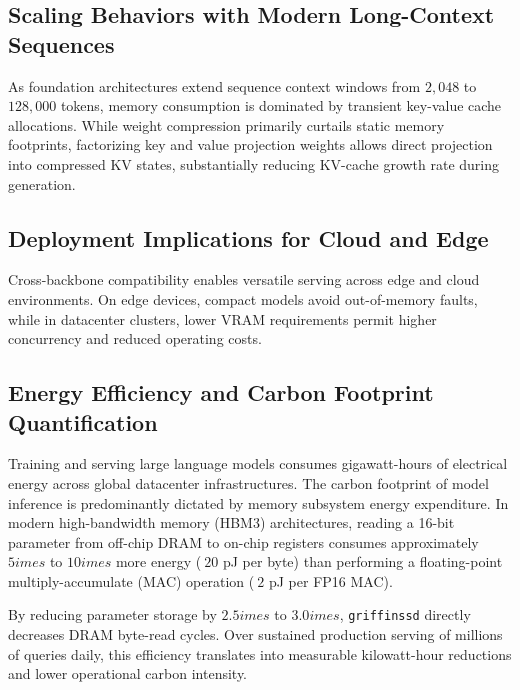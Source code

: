 \subsection{Scaling Behaviors with Modern Long-Context Sequences}
As foundation architectures extend sequence context windows from $2{,}048$ to $128{,}000$ tokens, memory consumption is dominated by transient key-value cache allocations. While weight compression primarily curtails static memory footprints, factorizing key and value projection weights allows direct projection into compressed KV states, substantially reducing KV-cache growth rate during generation.

\subsection{Deployment Implications for Cloud and Edge}
Cross-backbone compatibility enables versatile serving across edge and cloud environments. On edge devices, compact models avoid out-of-memory faults, while in datacenter clusters, lower VRAM requirements permit higher concurrency and reduced operating costs.

\subsection{Energy Efficiency and Carbon Footprint Quantification}
Training and serving large language models consumes gigawatt-hours of electrical energy across global datacenter infrastructures. The carbon footprint of model inference is predominantly dictated by memory subsystem energy expenditure. In modern high-bandwidth memory (HBM3) architectures, reading a 16-bit parameter from off-chip DRAM to on-chip registers consumes approximately $5	imes$ to $10	imes$ more energy ($~20$ pJ per byte) than performing a floating-point multiply-accumulate (MAC) operation ($~2$ pJ per FP16 MAC).

By reducing parameter storage by $2.5	imes$ to $3.0	imes$, \texttt{griffinssd} directly decreases DRAM byte-read cycles. Over sustained production serving of millions of queries daily, this efficiency translates into measurable kilowatt-hour reductions and lower operational carbon intensity.
